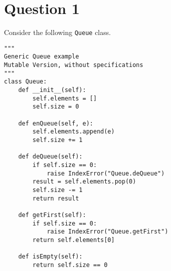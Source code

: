 \documentclass[11pt]{article}
\newcommand{\code}[1]{\texttt{#1}}
\begin{document}
\newpage
\section{Question 1}
Consider the following \code{Queue} class.

\begin{lstlisting}
"""
Generic Queue example
Mutable Version, without specifications
"""
class Queue:
    def __init__(self):
        self.elements = []
        self.size = 0

    def enQueue(self, e):
        self.elements.append(e)
        self.size += 1

    def deQueue(self):
        if self.size == 0:
            raise IndexError("Queue.deQueue")
        result = self.elements.pop(0)
        self.size -= 1
        return result

    def getFirst(self):
        if self.size == 0:
            raise IndexError("Queue.getFirst")
        return self.elements[0]

    def isEmpty(self):
        return self.size == 0

\end{lstlisting}
\end{document}
